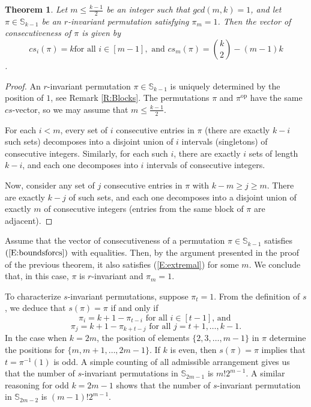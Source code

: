 \documentclass{birkjour}
\newtheorem{thm}{Theorem}[section]
\theoremstyle{definition}
\theoremstyle{remark}
\numberwithin{equation}{section}
\begin{document}
\begin{thm}\label{T:rinv}Let $m\leq\frac{k-1}{2}$
 be an integer such that $gcd(m,k)=1$, and
let $\pi\in \mathbb{S}_{k-1}$ be an $r$-invariant permutation
satisfying $\pi_m=1$. Then the vector of consecutiveness of $\pi$
is given by \begin{equation}\label{E:extremal} cs_i(\pi)=k\textrm{
for all }i\in[m-1],\textrm{ and } cs_m(\pi)= {k\choose 2}-(m-1)k
\end{equation}.
\end{thm}
\begin{proof} An $r$-invariant permutation $\pi\in
\mathbb{S}_{k-1}$ is uniquely determined by the position of $1$,
see Remark \ref{R:Blocks}. The permutations $\pi$ and
$\pi^{\mathrm{op}}$ have the same $cs$-vector, so we may assume
that $m\leq\frac{k-1}{2}$.

For each $i<m$, every set of $i$ consecutive entries in $\pi$
(there are exactly $k-i$ such sets) decomposes into a disjoint
union of $i$ intervals (singletons) of consecutive integers.
Similarly, for each such $i$, there are exactly $i$ sets of length
$k-i$, and each one decomposes into $i$ intervals of consecutive
integers.

 Now, consider any set of $j$
consecutive entries in $\pi$ with $k-m\geq j\geq m$. There are
exactly $k-j$ of such sets, and each one
 decomposes into a disjoint union of exactly $m$ of consecutive
integers (entries from the same block of $\pi$ are adjacent).
\end{proof}
Assume that the vector of consecutiveness of a permutation $\pi\in
\mathbb{S}_{k-1}$ satisfies $(\ref{E:boundsforcs})$ with
equalities. Then, by the argument presented in the proof of the
previous theorem, it also satisfies (\ref{E:extremal}) for some
$m$. We conclude that, in this case, $\pi$ is $r$-invariant and
$\pi_m=1$.


To characterize $s$-invariant permutations,
 suppose $\pi_t=1$. From the definition of $s$,
we deduce that $s(\pi)=\pi$ if and only if
$$\pi_i=k+1-\pi_{t-i}\textrm{ for all }i\in [t-1 ]\textrm{, and }$$
$$\pi_j=k+1-\pi_{k+t-j}\textrm{ for all }j=t+1,\ldots,k-1.$$
In the case when $k=2m$, the position of elements
$\{2,3,\ldots,m-1\}$ in $\pi$ determine the positions for
$\{m,m+1,\ldots,2m-1\}$. If $k$ is even, then $s(\pi)=\pi$ implies
that $t=\pi^{-1}(1)$ is odd. A simple counting of all admissible
arrangement gives us that the number of $s$-invariant permutations
in $\mathbb{S}_{2m-1}$ is $m!2^{m-1}$. A similar reasoning for odd
$k=2m-1$ shows that the number of $s$-invariant permutation in
$\mathbb{S}_{2m-2}$ is $(m-1)!2^{m-1}$.
\end{document}
